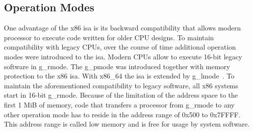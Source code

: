\subsection{Operation Modes}
\label{sec:state:technical:modes}
One advantage of the x86 \gls{isa} is its backward compatibility that allows
modern processor to execute code written for older CPU designs. To maintain
compatibility with legacy CPUs, over the course of time additional operation
modes were introduced to the \gls{isa}. Modern CPUs allow to execute 16-bit
legacy software in \gls{g_rmode}. The \gls{g_pmode} was introduced together with
memory protection to the x86 \gls{isa}. With x86\_64 the \gls{isa} is extended
by \gls{g_lmode}~\cite{intel_sdm}. To maintain the aforementioned compatibility
to legacy software, all x86 systems start in 16-bit \gls{g_rmode}. Because of
the limitation of the address space to the first 1 MiB of memory, code that
transfers a processor from \gls{g_rmode} to any other operation mode has to
reside in the address range of 0x500 to 0x7FFFF. This address range is called
low memory and is free for usage by system software.


